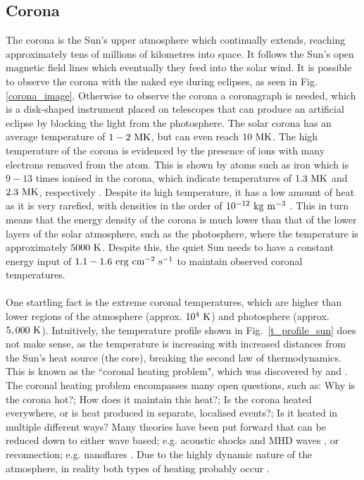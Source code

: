 \documentclass[12pt]{ociamthesis}
\newcommand{\np}{\\ \\}
\begin{document}
\subsection{Corona}
\label{ssec:corona}
The corona is the Sun's upper atmosphere which continually extends, reaching approximately tens of millions of kilometres into space. It follows the Sun's open magnetic field lines which eventually they feed into the solar wind. It is possible to observe the corona with the naked eye during eclipses, as seen in Fig. \ref{corona_image}. Otherwise to observe the corona a coronagraph is needed, which is a disk-shaped instrument placed on telescopes that can produce an artificial eclipse by blocking the light from the photosphere. The solar corona has an average temperature of $1-2~\rm{MK}$, but can even reach $10~\rm{MK}$. The high temperature of the corona is evidenced by the presence of ions with many electrons removed from the atom. This is shown by atoms such as iron which is $9-13$ times ionised in the corona, which indicate temperatures of $1.3~\rm{MK}$ and $2.3~\rm{MK}$, respectively \citep{Grotrian1939,Edl1943}. Despite its high temperature, it has a low amount of heat as it is very rarefied, with densities in the order of $10^{-12}~\rm{kg~m^{-3}}$ \citep{priest2014magnetohydrodynamics}. This in turn means that the energy density of the corona is much lower than that of the lower layers of the solar atmosphere, such as the photosphere, where the temperature is approximately $5000~\rm{K}$. Despite this, the quiet Sun needs to have a constant energy input of $1.1-1.6~\rm{erg~cm^{-2}~s^{-1}}$ \citep{Sakurai2017PJAB9387S} to maintain observed coronal temperatures. \np
%
One startling fact is the extreme coronal temperatures, which are higher than lower regions of the atmosphere (approx. $10^4~\rm{K}$) and photosphere (approx. $5,000~\rm{K}$). Intuitively, the temperature profile shown in Fig.~\ref{t_profile_sun} does not make sense, as the temperature is increasing with increased distances from the Sun's heat source (the core), breaking the second law of thermodynamics. This is known as the ``coronal heating problem", which was discovered by \cite{Grotrian1939} and \cite{Edl1943}. The coronal heating problem encompasses many open questions, such as: Why is the corona hot?; How does it maintain this heat?; Is the corona heated everywhere, or is heat produced in separate, localised events?; Is it heated in multiple different ways? Many theories have been put forward that can be reduced down to either wave based; e.g. acoustic shocks and MHD waves \citep{Alfv1947MNRAS107211A, Uchida1974SoPh35451U, Wentzel1974SoPh39129W, Priest1998Natur393545P, Hollweg1982ApJ254806H, Antolin2008IAUS247279A, Escande2019NatSR914274E}, or reconnection; e.g. nanoflares \citep{Parker1988ApJ330474P, Cargill1993SoPh147263C, Parnell2000ApJ529554P, Klimchuk2001ApJ553440K,  Cargill2004ApJ605911C, Antolin2021NatAs554A}. Due to the highly dynamic nature of the atmosphere, in reality both types of heating probably occur \citep{Zirker1993SoPh14843Z,Parnell2012RSPTA3703217P}. \np
\end{document}
